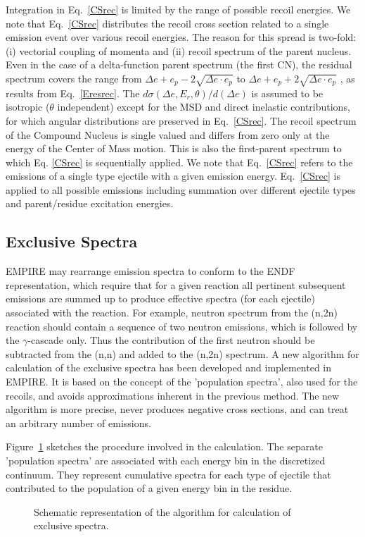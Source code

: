 Integration in Eq.~\ref{CSrec} is limited by the range of possible recoil
energies. We note that Eq.~\ref{CSrec} distributes the recoil cross section
related to a single emission event over various recoil energies. The reason
for this spread is two-fold: (i) vectorial coupling of momenta and (ii)
recoil spectrum of the parent nucleus. Even in the case of a delta-function
parent spectrum (the first CN), the residual spectrum covers the range from $%
\Delta e+e_{p}-2\sqrt{\Delta e\cdot e_{p}}$ to $\Delta e+e_{p}+2\sqrt{\Delta
e\cdot e_{p}}$ , as results from Eq.~\ref{Eresrec}. The $d\sigma(\Delta
e,E_{r},\theta)/d(\Delta e)$ is assumed to be isotropic ($\theta$
independent) except for the MSD%
 and direct inelastic contributions, for which angular
distributions are preserved in Eq.~\ref{CSrec}. The recoil spectrum of the
Compound Nucleus is single valued and differs from zero only at the energy
of the Center of Mass motion. This is also the first-parent spectrum to
which Eq. \ref{CSrec} is sequentially applied. We note that Eq.~\ref{CSrec}
refers to the emissions of a single type ejectile with a given emission
energy. Eq.~\ref{CSrec} is applied to all possible emissions including
summation over different ejectile types and parent/residue excitation
energies.

\subsection{Exclusive Spectra}

EMPIRE may rearrange emission spectra to conform to the ENDF representation,
which require that for a given reaction all pertinent subsequent emissions
are summed up to produce effective spectra (for each ejectile) associated
with the reaction. For example, neutron spectrum from the (n,2n) reaction
should contain a sequence of two neutron emissions, which is followed by the
$\gamma$-cascade only. Thus the contribution of the first neutron should be
subtracted from the (n,n) and added to the (n,2n) spectrum. A new algorithm
for calculation of the exclusive spectra has been developed and implemented
in EMPIRE. It is based on the concept of the 'population spectra', also used
for the recoils, and avoids approximations inherent in the previous method.
The new algorithm is more precise, never produces negative cross sections,
and can treat an arbitrary number of emissions.

Figure~\ref{exclusive} sketches the procedure involved in the calculation.
The separate 'population spectra' are associated with each energy bin in the
discretized continuum. They represent cumulative spectra for each type of
ejectile that contributed to the population of a given energy bin in the
residue.
\begin{figure}[htbp]
\caption{Schematic representation of the algorithm for calculation of
exclusive spectra.}
\label{exclusive}
\end{figure}

